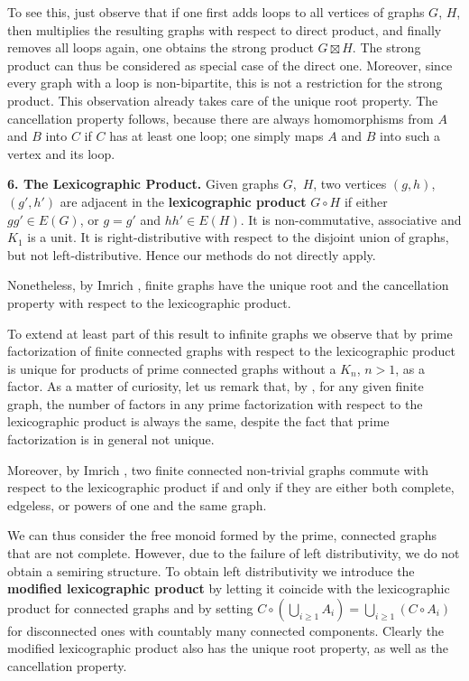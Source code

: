 \documentclass{amsart}
\theoremstyle{plain}
\theoremstyle{definition}
\newcommand{\defit}[1]{\textbf{#1}}
\begin{document}
To see this, just observe that if one first adds loops to all vertices of graphs $G$, $H$, then multiplies the resulting graphs with respect to direct product, and finally removes all loops again, one obtains the strong product $G\boxtimes H$.    The strong product can thus be considered as special case of the direct one. Moreover, since every graph with a loop is non-bipartite, this is not a restriction for the strong product.
This observation already takes care of the unique root property. The cancellation property follows, because there are always homomorphisms from $A$ and $B$
into $C$ if $C$ has at least one loop; one simply  maps $A$ and $B$ into such a vertex and its loop.
\smallskip


\noindent
\textbf{6. The Lexicographic Product.} Given graphs $G$,~$H$, two vertices $(g,h)$, $(g',h')$ are adjacent in the \defit{lexicographic product} $G\circ H$ if either $gg' \in E(G)$, or $g=g'$ and $hh'\in E(H)$. It is non-commutative, associative and $K_1$ is a unit. It is right-distributive with respect to the disjoint union of graphs, but not left-distributive. Hence our methods do not directly apply.


Nonetheless,  by Imrich \cite{im1972},
finite graphs have the unique root and the cancellation property with respect to the lexicographic product.

To extend at least part of this result to infinite graphs we observe that by \cite{im1972} prime factorization of finite connected graphs with respect to the lexicographic product is unique for products of prime connected graphs without a $K_n$, $n> 1$, as a factor. As a matter of curiosity, let us remark that, by \cite{im1972},  for any given finite graph, the number of factors in any prime factorization with respect to the lexicographic product is always the same, despite the fact that prime factorization is in general not unique.

Moreover, by Imrich \cite{im1969},  two finite connected non-trivial graphs commute with respect to the lexicographic product if and only if they are either both complete, edgeless, or powers of one and the same graph.

We can thus consider the free monoid formed by the prime, connected graphs that are not complete. However, due to the failure of left distributivity, we do not obtain a semiring structure.
To obtain left distributivity we introduce the \defit{modified lexicographic product}  by letting it coincide with the lexicographic product for connected graphs and by setting $C\circ (\bigcup_{i\ge 1} A_i)
 = \bigcup_{i\ge 1} (C\circ A_i)$ for disconnected ones with countably many connected components. Clearly the modified lexicographic product also has the  unique root property, as well as the cancellation property.
 \smallskip
\end{document}
